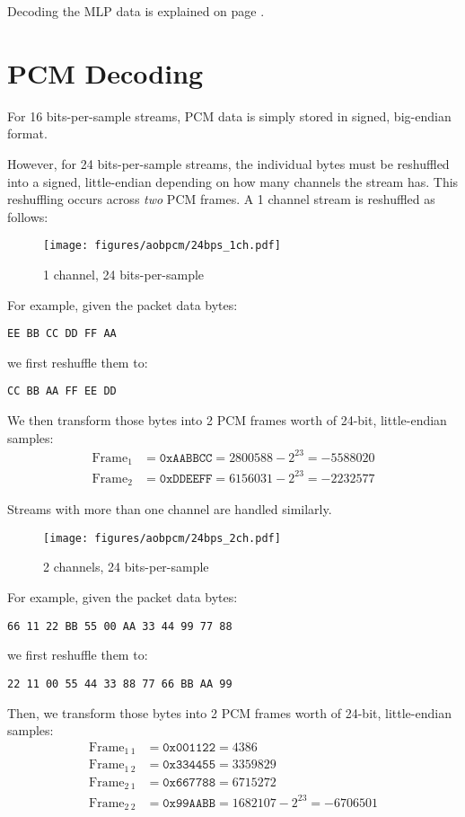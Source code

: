 Decoding the MLP data is explained on page \pageref{aob_mlp}.

\clearpage

\section{PCM Decoding}
\label{aob_pcm}

For 16 bits-per-sample streams, PCM data is simply stored in
signed, big-endian format.

However, for 24 bits-per-sample streams, the individual bytes must
be reshuffled into a signed, little-endian depending on
how many channels the stream has.
This reshuffling occurs across \textit{two} PCM frames.
A 1 channel stream is reshuffled as follows:
\begin{figure}[h]
\texttt{[image: figures/aobpcm/24bps\_1ch.pdf]}
\caption{1 channel, 24 bits-per-sample}
\end{figure}
\par
\noindent
For example, given the packet data bytes:
\begin{Verbatim}
EE BB CC DD FF AA
\end{Verbatim}
\par
\noindent
we first reshuffle them to:
\begin{Verbatim}
CC BB AA FF EE DD
\end{Verbatim}
We then transform those bytes into 2 PCM frames worth of 24-bit,
little-endian samples:
\begin{align*}
\text{Frame}_1 &= \texttt{0xAABBCC} = 2800588 - 2 ^ {23} = -5588020 \\
\text{Frame}_2 &= \texttt{0xDDEEFF} = 6156031 - 2 ^ {23} = -2232577
\end{align*}

Streams with more than one channel are handled similarly.

\clearpage

\begin{figure}[h!]
\texttt{[image: figures/aobpcm/24bps\_2ch.pdf]}
\caption{2 channels, 24 bits-per-sample}
\end{figure}
\par
\noindent
For example, given the packet data bytes:
\begin{Verbatim}
66 11 22 BB 55 00 AA 33 44 99 77 88
\end{Verbatim}
\par
\noindent
we first reshuffle them to:
\begin{Verbatim}
22 11 00 55 44 33 88 77 66 BB AA 99
\end{Verbatim}
\par
\noindent
Then, we transform those bytes into 2 PCM frames worth of 24-bit,
little-endian samples:
\begin{align*}
\text{Frame}_{1~1} &= \texttt{0x001122} = 4386 \\
\text{Frame}_{1~2} &= \texttt{0x334455} = 3359829 \\
\text{Frame}_{2~1} &= \texttt{0x667788} = 6715272 \\
\text{Frame}_{2~2} &= \texttt{0x99AABB} = 1682107 - 2 ^ {23} = -6706501
\end{align*}

